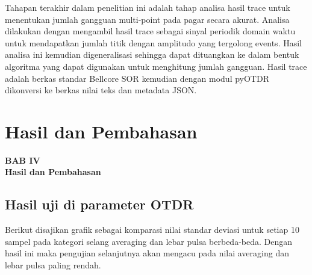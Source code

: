 \documentclass[12pt]{article}
\begin{document}
	Tahapan terakhir dalam penelitian ini adalah tahap analisa hasil trace untuk menentukan jumlah gangguan multi-point pada pagar secara akurat.
	Analisa dilakukan dengan mengambil hasil trace sebagai sinyal periodik domain waktu untuk mendapatkan jumlah titik dengan amplitudo yang tergolong events.
	Hasil analisa ini kemudian digeneralisasi sehingga dapat dituangkan ke dalam bentuk algoritma yang dapat digunakan untuk menghitung jumlah gangguan.
	Hasil trace adalah berkas standar Bellcore SOR kemudian dengan modul pyOTDR dikonversi ke berkas nilai teks dan metadata JSON.

	
\newpage

	\setcounter{figure}{0}
	
	\section{Hasil dan Pembahasan}
	
	\begin{center}
		{\large \textbf{BAB IV}} \\
		{\large \textbf{Hasil dan Pembahasan}}
	\end{center}
	
	\subsection{Hasil uji di parameter OTDR}
	
	Berikut disajikan grafik sebagai komparasi nilai standar deviasi untuk setiap 10 sampel pada kategori selang averaging dan lebar pulsa berbeda-beda.
	Dengan hasil ini maka pengujian selanjutnya akan mengacu pada nilai averaging dan lebar pulsa paling rendah.
	
\end{document}
